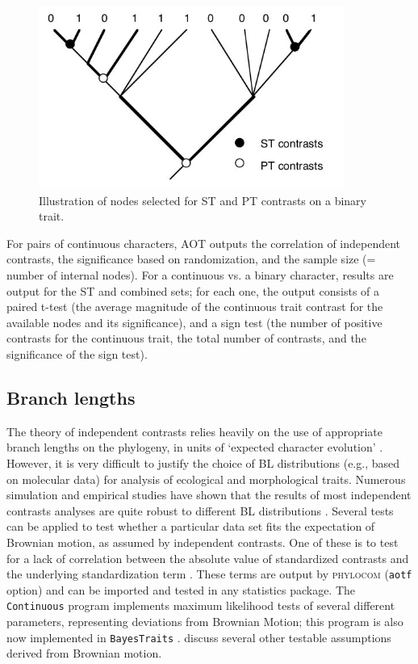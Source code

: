 \documentclass[12pt,letterpaper]{article}
\begin{document}
\begin{figure}[!ht]
\centering
\includegraphics[width=10cm]{img/fig2.jpg}
\caption{Illustration of nodes selected for ST and PT contrasts on a binary trait.}
\label{fig2}
\end{figure}

For pairs of continuous characters, AOT outputs the correlation of
independent contrasts, the significance based on randomization, and
the sample size (= number of internal nodes). For a continuous vs. a
binary character, results are output for the ST and combined sets; for
each one, the output consists of a paired t-test (the average
magnitude of the continuous trait contrast for the available nodes and
its significance), and a sign test (the number of positive contrasts
for the continuous trait, the total number of contrasts, and the
significance of the sign test).

\subsection{Branch lengths}

The theory of independent contrasts relies heavily on the use of
appropriate branch lengths on the phylogeny, in units of `expected
character evolution' \citep{felsenstein1985phy}. However, it is very
difficult to justify the choice of BL distributions (e.g., based on
molecular data) for analysis of ecological and morphological
traits. Numerous simulation and empirical studies have shown that the
results of most independent contrasts analyses are quite robust to
different BL distributions \citep[e.g.,][]{diazuriarte1996tes,
  ackerly2000tax}. Several tests can be applied to test whether a
particular data set fits the expectation of Brownian motion, as
assumed by independent contrasts. One of these is to test for a lack
of correlation between the absolute value of standardized contrasts
and the underlying standardization term \citep[square root of the sum
  of the subtending branch lengths,][]{garland1992pro}. These terms
are output by {\scshape phylocom} (\verb|aotf| option) and can be
imported and tested in any statistics package. The \verb|Continuous|
program \citep{pagel1999inf} implements maximum likelihood tests of
several different parameters, representing deviations from Brownian
Motion; this program is also now implemented in \verb|BayesTraits|
\citep{pagel2006bay}.  \citet{oliver2007mod} discuss several other
testable assumptions derived from Brownian motion.
\end{document}
